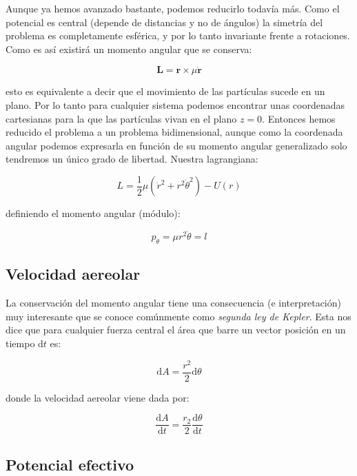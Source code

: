 \documentclass[12pt,a4paper]{book}
\newcommand{\D}{\mathrm{d}}
\newcommand{\rn}{\mathbf{r}}
\newcommand{\Ln}{\mathbf{L}}
\begin{document}
Aunque ya hemos avanzado bastante, podemos reducirlo todavía más. Como el potencial es central (depende de distancias y no de ángulos) la simetría del problema es completamente esférica, y por lo tanto invariante frente a rotaciones. Como es así existirá un momento angular que se conserva:

\begin{equation}
\Ln = \rn \times \mu \dot{\rn}
\end{equation}

esto es equivalente a decir que el movimiento de las partículas sucede en un plano. Por lo tanto para cualquier sistema podemos encontrar unas coordenadas cartesianas para la que las partículas vivan en el plano $z=0$. Entonces hemos reducido el problema a un problema bidimensional, aunque como la coordenada angular podemos expresarla en función de su momento angular generalizado solo tendremos un único grado de libertad. Nuestra lagrangiana:

\begin{equation}
L = \frac{1}{2} \mu (\dot{r}^2 + r^2 \dot{\theta}^2 ) - U(r)
\end{equation}

definiendo el momento angular (módulo):

\begin{equation}
p_\theta  = \mu r^2 \dot{\theta} = l
\end{equation}

\subsection{Velocidad aereolar}

La conservación del momento angular tiene una consecuencia (e interpretación) muy interesante que se conoce comúnmente como \textit{segunda ley de Kepler}. Esta nos dice que para cualquier fuerza central el área que barre un vector posición en un tiempo $\D t$ es:

\begin{equation}
\D A = \dfrac{r^2}{2} \D \theta
\end{equation}

donde la velocidad aereolar viene dada por:

\begin{equation}
\dfrac{\D A}{\D t} = \dfrac{r_2}{2} \dfrac{\D \theta}{\D t}
\end{equation}


\subsection{Potencial efectivo}
\end{document}
